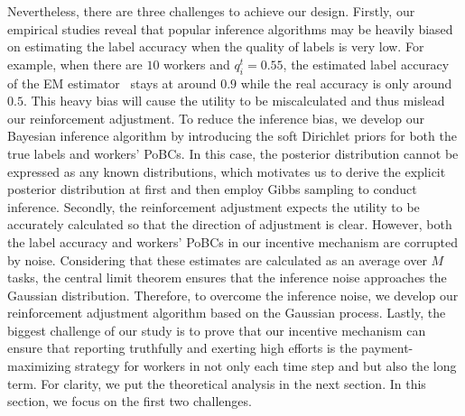 \documentclass{article}
\begin{document}
Nevertheless, there are three challenges to achieve our design. Firstly, our empirical studies reveal that popular inference algorithms may be heavily biased on estimating the label accuracy when the quality of labels is very low. For example, when there are $10$ workers and $q_i^t=0.55$, the estimated label accuracy of the EM estimator~\cite{dawid1979maximum,raykar2010learning} stays at around $0.9$ while the real accuracy is only around $0.5$.
This heavy bias will cause the utility to be miscalculated and thus mislead our reinforcement adjustment.
To reduce the inference bias, we develop our Bayesian inference algorithm by introducing the soft Dirichlet priors for both the true labels and workers' PoBCs.
In this case, the posterior distribution cannot be expressed as any known distributions, which motivates us to derive the explicit posterior distribution at first and then employ Gibbs sampling to conduct inference.
{\color{red}Secondly, the reinforcement adjustment expects the utility to be accurately calculated so that the direction of adjustment is clear.
However, both the label accuracy and workers' PoBCs in our incentive mechanism are corrupted by noise.
Considering that these estimates are calculated as an average over $M$ tasks, the central limit theorem ensures that the inference noise approaches the Gaussian distribution.
Therefore, to overcome the inference noise, we develop our reinforcement adjustment algorithm based on the Gaussian process.}
Lastly, the biggest challenge of our study is to prove that our incentive mechanism can ensure that reporting truthfully and exerting high efforts is the payment-maximizing strategy for workers in not only each time step and but also the long term.
For clarity, we put the theoretical analysis in the next section.
In this section, we focus on the first two challenges.


\end{document}
